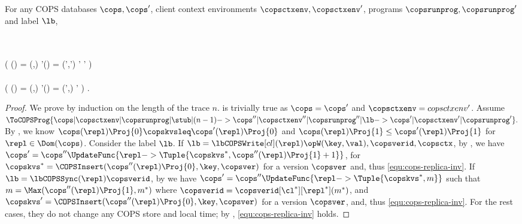\label{sec:proof-monotonic-cops-replca-client}
\begin{proposition}
\label{prop:cops-inv}
For any COPS databases \( \cops, \cops'\), client context environments \( \copsctxenv, \copsctxenv' \),
programs \( \copsrunprog, \copsrunprog' \) and label \( \lb \),
\begin{Formulae}
\begin{Formula}
    \\ \implies {} 
    \\ \left( \cops(\repl) = (\copskvs,\ts) \land
    \cops'(\repl) = (\copskvs',\ts') 
    \implies \copskvs \copskvsleq \copskvs'
    \land \ts \leq \ts'  \right)
    \\ {} \land {} 
    \\ \left( \copsctxenv(\cl) = (\copsctx,\stub) 
    \land  \copsctxenv'(\cl) = (\copsctx',\stub) 
    \implies \copsctx \subseteq  \copsctx' \right) .
\label{equ:cops-replica-inv}
\end{Formula}
\end{Formulae}
\end{proposition}
\begin{proof}
We prove by induction on the length of the trace \( n \).
     is trivially true as \( \cops = \cops' \) and \( \copsctxenv = copsctxenv' \).
    Assume
    \(
        \ToCOPSProg{ \cops | \copsctxenv | \copsrunprog | \stub | (n-1)
        -> \cops'' | \copsctxenv'' | \copsrunprog'' | \lb
        -> \cops' | \copsctxenv' | \copsrunprog' }.
    \)
    By \ih, we know \( \cops(\repl)\Proj{0} \copskvsleq \cops'(\repl)\Proj{0} \) 
    and \( \cops(\repl)\Proj{1} \leq \cops'(\repl)\Proj{1} \)  for \( \repl \in \Dom(\cops) \).
    Consider the label \( \lb \).
    If \( \lb = \lbCOPSWrite[cl](\repl){\opW(\key,\val), \copsverid, \copsctx } \),
    by \rCOPSWrite, we have \( \cops' = \cops''\UpdateFunc{{\repl} -> \Tuple{\copskvs^*, \cops''(\repl)\Proj{1} + 1}}\),
    for \( \copskvs^* = \COPSInsert(\cops''(\repl)\Proj{0},\key,\copsver) \) for a version \( \copsver \)
    and, thus \cref{equ:cops-replica-inv}.
    If \( \lb = \lbCOPSSync(\repl){\copsverid} \),
    by \rCOPSSync we have \( \cops' = \cops''\UpdateFunc{\repl -> \Tuple{\copskvs^*, m } }\) such that
    \( m =\Max(\cops''(\repl)\Proj{1},m^*) \) where \( \copsverid = \copsverid[\cl^*][\repl^*](m^*)\), 
    and \( \copskvs' = \COPSInsert(\cops''(\repl)\Proj{0},\key,\copsver) \) for a version \( \copsver \),
    and, thus \cref{equ:cops-replica-inv}.
    For the rest cases, they do not change any COPS store and local time;
    by \ih, \cref{equ:cops-replica-inv} holds. \qedhere
\end{proof}


